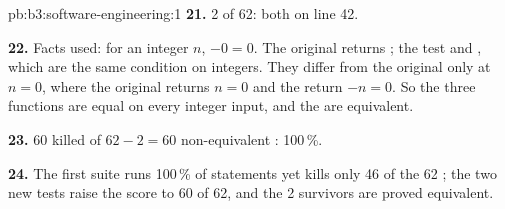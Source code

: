 \begin{solution}{pb:b3:software-engineering:1}
\textbf{21.} 2 of 62: both on line 42.

\textbf{22.} Facts used: for an integer $n$, $-0 = 0$. The original returns ; the  test  and , which are the same condition on integers. They differ from the original only at $n = 0$, where the original returns $n = 0$ and the  return $-n = 0$. So the three functions are equal on every integer input, and the  are equivalent.

\textbf{23.} 60 killed of $62 - 2 = 60$ non-equivalent : 100\,\%.

\textbf{24.} The first suite runs 100\,\% of statements yet kills only 46 of the 62 ; the two new tests raise the score to 60 of 62, and the 2 survivors are proved equivalent.
\end{solution}
